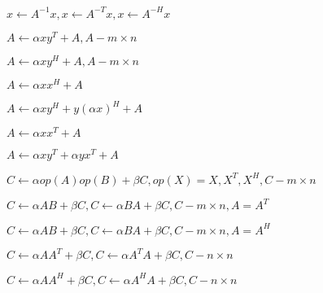 {\newpage\clearpage
{}%
$ x \leftarrow A ^{-1} x, x \leftarrow A ^{-T} x, x \leftarrow A ^ {-H} x $%
\lthtmlinlinemathZ
\lthtmlcheckvsize\clearpage}

{\newpage\clearpage
{}%
$ A \leftarrow \alpha x y ^{T} + A , A - m \times n $%
\lthtmlinlinemathZ
\lthtmlcheckvsize\clearpage}

{\newpage\clearpage
{}%
$ A \leftarrow \alpha x y ^{H} + A , A - m \times n $%
\lthtmlinlinemathZ
\lthtmlcheckvsize\clearpage}

{\newpage\clearpage
{}%
$ A \leftarrow \alpha x x ^{H} + A $%
\lthtmlinlinemathZ
\lthtmlcheckvsize\clearpage}

{\newpage\clearpage
{}%
$ A \leftarrow \alpha x y ^{H} + y ( \alpha x ) ^ {H} + A $%
\lthtmlinlinemathZ
\lthtmlcheckvsize\clearpage}

{\newpage\clearpage
{}%
$ A \leftarrow \alpha x x ^{T} + A $%
\lthtmlinlinemathZ
\lthtmlcheckvsize\clearpage}

{\newpage\clearpage
{}%
$ A \leftarrow \alpha x y ^{T} + \alpha y x ^ {T} + A $%
\lthtmlinlinemathZ
\lthtmlcheckvsize\clearpage}

{\newpage\clearpage
{}%
$ C \leftarrow \alpha op(A)op(B) + \beta C, op(X) = X, X ^{T}, X ^{H}, C - m \times n $%
\lthtmlinlinemathZ
\lthtmlcheckvsize\clearpage}

{\newpage\clearpage
{}%
$ C \leftarrow \alpha AB + \beta C, C \leftarrow \alpha BA + \beta C, C - m \times n, A = A ^{T} $%
\lthtmlinlinemathZ
\lthtmlcheckvsize\clearpage}

{\newpage\clearpage
{}%
$ C \leftarrow \alpha AB + \beta C, C \leftarrow \alpha BA + \beta C, C - m \times n, A = A ^{H} $%
\lthtmlinlinemathZ
\lthtmlcheckvsize\clearpage}

{\newpage\clearpage
{}%
$ C \leftarrow \alpha AA ^{T} + \beta C, C \leftarrow \alpha A ^{T} A + \beta C, C - n \times n $%
\lthtmlinlinemathZ
\lthtmlcheckvsize\clearpage}

{\newpage\clearpage
{}%
$ C \leftarrow \alpha AA ^{H} + \beta C, C \leftarrow \alpha A ^{H} A + \beta C, C - n \times n $%
\lthtmlinlinemathZ
\lthtmlcheckvsize\clearpage}


